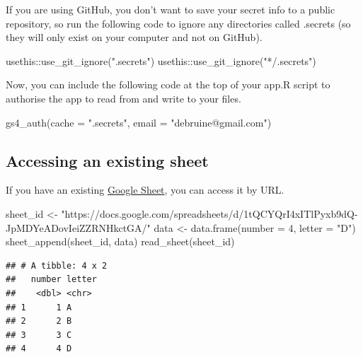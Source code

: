 \documentclass[
]{book}
\newenvironment{Shaded}{\begin{snugshade}}{\end{snugshade}}
\newcommand{\AttributeTok}[1]{\textcolor[rgb]{0.77,0.63,0.00}{#1}}
\newcommand{\DecValTok}[1]{\textcolor[rgb]{0.00,0.00,0.81}{#1}}
\newcommand{\FunctionTok}[1]{\textcolor[rgb]{0.00,0.00,0.00}{#1}}
\newcommand{\NormalTok}[1]{#1}
\newcommand{\OtherTok}[1]{\textcolor[rgb]{0.56,0.35,0.01}{#1}}
\newcommand{\SpecialCharTok}[1]{\textcolor[rgb]{0.00,0.00,0.00}{#1}}
\newcommand{\StringTok}[1]{\textcolor[rgb]{0.31,0.60,0.02}{#1}}
\begin{document}
If you are using GitHub, you don't want to save your secret info to a public repository, so run the following code to ignore any directories called .secrets (so they will only exist on your computer and not on GitHub).

\begin{Shaded}
\begin{Highlighting}[]
\NormalTok{usethis}\SpecialCharTok{::}\FunctionTok{use\_git\_ignore}\NormalTok{(}\StringTok{".secrets"}\NormalTok{)}
\NormalTok{usethis}\SpecialCharTok{::}\FunctionTok{use\_git\_ignore}\NormalTok{(}\StringTok{"*/.secrets"}\NormalTok{)}
\end{Highlighting}
\end{Shaded}

Now, you can include the following code at the top of your app.R script to authorise the app to read from and write to your files.

\begin{Shaded}
\begin{Highlighting}[]
\FunctionTok{gs4\_auth}\NormalTok{(}\AttributeTok{cache =} \StringTok{".secrets"}\NormalTok{, }\AttributeTok{email =} \StringTok{"debruine@gmail.com"}\NormalTok{)}
\end{Highlighting}
\end{Shaded}

\hypertarget{accessing-an-existing-sheet}{%
\subsection{Accessing an existing sheet}\label{accessing-an-existing-sheet}}

If you have an existing \href{https://docs.google.com/spreadsheets/u/0/}{Google Sheet}, you can access it by URL.

\begin{Shaded}
\begin{Highlighting}[]
\NormalTok{sheet\_id }\OtherTok{\textless{}{-}} \StringTok{"https://docs.google.com/spreadsheets/d/1tQCYQrI4xITlPyxb9dQ{-}JpMDYeADovIeiZZRNHkctGA/"}
\NormalTok{data }\OtherTok{\textless{}{-}} \FunctionTok{data.frame}\NormalTok{(}\AttributeTok{number =} \DecValTok{4}\NormalTok{, }\AttributeTok{letter =} \StringTok{"D"}\NormalTok{)}
\FunctionTok{sheet\_append}\NormalTok{(sheet\_id, data)}
\FunctionTok{read\_sheet}\NormalTok{(sheet\_id)}
\end{Highlighting}
\end{Shaded}

\begin{verbatim}
## # A tibble: 4 x 2
##   number letter
##    <dbl> <chr> 
## 1      1 A     
## 2      2 B     
## 3      3 C     
## 4      4 D
\end{verbatim}
\end{document}

